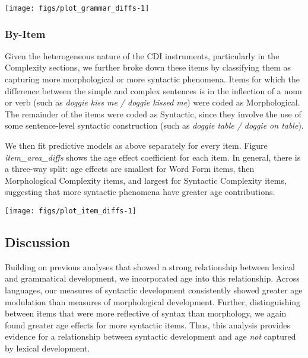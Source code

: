\documentclass[authoryear, review]{elsarticle}
\newenvironment{CodeChunk}{}{}
\begin{document}
\begin{CodeChunk}

\texttt{[image: figs/plot\_grammar\_diffs-1]} \end{CodeChunk}

\subsubsection{By-Item}\label{by-item}

Given the heterogeneous nature of the CDI instruments, particularly in
the Complexity sections, we further broke down these items by
classifying them as capturing more morphological or more syntactic
phenomena. Items for which the difference between the simple and complex
sentences is in the inflection of a noun or verb (such as \emph{doggie
kiss me / doggie kissed me}) were coded as Morphological. The remainder
of the items were coded as Syntactic, since they involve the use of some
sentence-level syntactic construction (such as \emph{doggie table /
doggie on table}).

We then fit predictive models as above separately for every item. Figure
\emph{item\_area\_diffs} shows the age effect coefficient for each item.
In general, there is a three-way split: age effects are smallest for
Word Form items, then Morphological Complexity items, and largest for
Syntactic Complexity items, suggesting that more syntactic phenomena
have greater age contributions.

\begin{CodeChunk}

\texttt{[image: figs/plot\_item\_diffs-1]} \end{CodeChunk}

\subsection{Discussion}\label{discussion}

Building on previous analyses that showed a strong relationship between
lexical and grammatical development, we incorporated age into this
relationship. Across languages, our measures of syntactic development
consistently showed greater age modulation than measures of
morphological development. Further, distinguishing between items that
were more reflective of syntax than morphology, we again found greater
age effects for more syntactic items. Thus, this analysis provides
evidence for a relationship between syntactic development and age
\emph{not} captured by lexical development.
\end{document}
